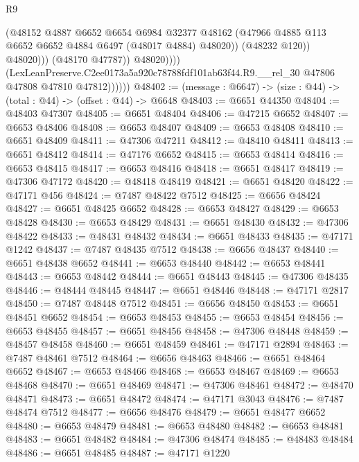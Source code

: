 \begin{lexlean}{R9}
\begin{coremodule}
                                (@48152
                                  @4887
                                  @6652
                                  @6654
                                  @6984
                                  @32377
                                  @48162
                                  (@47966 @4885 @113 @6652 @6652 @4884 @6497 (@48017 @4884) @48020))
                                (@48232 @120))
                              @48020)))
                        (@48170 @47787))
                      @48020))))
              (LexLeanPreserve.C2ee0173a5a920c78788fdf101ab63f44.R9.__rel_30
                @47806
                @47808
                @47810
                @47812))))))
@48402 := (message : @6647) -> (size : @44) -> (total : @44) -> (offset : @44) -> @6648
@48403 := @6651 @44350
@48404 := @48403 @47307
@48405 := @6651 @48404
@48406 := @47215 @6652
@48407 := @6653 @48406
@48408 := @6653 @48407
@48409 := @6653 @48408
@48410 := @6651 @48409
@48411 := @47306 @47211
@48412 := @48410 @48411
@48413 := @6651 @48412
@48414 := @47176 @6652
@48415 := @6653 @48414
@48416 := @6653 @48415
@48417 := @6653 @48416
@48418 := @6651 @48417
@48419 := @47306 @47172
@48420 := @48418 @48419
@48421 := @6651 @48420
@48422 := @47171 @456
@48424 := @7487 @48422 @7512
@48425 := @6656 @48424
@48427 := @6651 @48425 @6652
@48428 := @6653 @48427
@48429 := @6653 @48428
@48430 := @6653 @48429
@48431 := @6651 @48430
@48432 := @47306 @48422
@48433 := @48431 @48432
@48434 := @6651 @48433
@48435 := @47171 @1242
@48437 := @7487 @48435 @7512
@48438 := @6656 @48437
@48440 := @6651 @48438 @6652
@48441 := @6653 @48440
@48442 := @6653 @48441
@48443 := @6653 @48442
@48444 := @6651 @48443
@48445 := @47306 @48435
@48446 := @48444 @48445
@48447 := @6651 @48446
@48448 := @47171 @2817
@48450 := @7487 @48448 @7512
@48451 := @6656 @48450
@48453 := @6651 @48451 @6652
@48454 := @6653 @48453
@48455 := @6653 @48454
@48456 := @6653 @48455
@48457 := @6651 @48456
@48458 := @47306 @48448
@48459 := @48457 @48458
@48460 := @6651 @48459
@48461 := @47171 @2894
@48463 := @7487 @48461 @7512
@48464 := @6656 @48463
@48466 := @6651 @48464 @6652
@48467 := @6653 @48466
@48468 := @6653 @48467
@48469 := @6653 @48468
@48470 := @6651 @48469
@48471 := @47306 @48461
@48472 := @48470 @48471
@48473 := @6651 @48472
@48474 := @47171 @3043
@48476 := @7487 @48474 @7512
@48477 := @6656 @48476
@48479 := @6651 @48477 @6652
@48480 := @6653 @48479
@48481 := @6653 @48480
@48482 := @6653 @48481
@48483 := @6651 @48482
@48484 := @47306 @48474
@48485 := @48483 @48484
@48486 := @6651 @48485
@48487 := @47171 @1220

\end{coremodule}
\end{lexlean}
